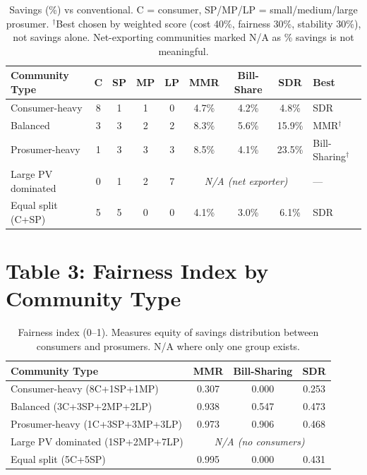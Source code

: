 \documentclass[12pt]{article}
\begin{document}
\begin{table}[h!]
\centering
\renewcommand{\arraystretch}{1.35}
\begin{tabular}{l c c c c c c c l}
\toprule
\textbf{Community Type} & \textbf{C} & \textbf{SP} & \textbf{MP} & \textbf{LP} & \textbf{MMR} & \textbf{Bill-Share} & \textbf{SDR} & \textbf{Best} \\
\midrule
Consumer-heavy & 8 & 1 & 1 & 0 & 4.7\% & 4.2\% & 4.8\% & SDR \\
Balanced & 3 & 3 & 2 & 2 & 8.3\% & 5.6\% & 15.9\% & MMR$^\dagger$ \\
Prosumer-heavy & 1 & 3 & 3 & 3 & 8.5\% & 4.1\% & 23.5\% & Bill-Sharing$^\dagger$ \\
Large PV dominated & 0 & 1 & 2 & 7 & \multicolumn{3}{c}{\textit{N/A (net exporter)}} & --- \\
Equal split (C+SP) & 5 & 5 & 0 & 0 & 4.1\% & 3.0\% & 6.1\% & SDR \\
\bottomrule
\end{tabular}
\caption*{Savings (\%) vs conventional. C = consumer, SP/MP/LP = small/medium/large prosumer. $^\dagger$Best chosen by weighted score (cost 40\%, fairness 30\%, stability 30\%), not savings alone. Net-exporting communities marked N/A as \% savings is not meaningful.}
\end{table}

\section*{Table 3: Fairness Index by Community Type}

\begin{table}[h!]
\centering
\renewcommand{\arraystretch}{1.35}
\begin{tabular}{l c c c}
\toprule
\textbf{Community Type} & \textbf{MMR} & \textbf{Bill-Sharing} & \textbf{SDR} \\
\midrule
Consumer-heavy (8C+1SP+1MP) & 0.307 & 0.000 & 0.253 \\
Balanced (3C+3SP+2MP+2LP) & 0.938 & 0.547 & 0.473 \\
Prosumer-heavy (1C+3SP+3MP+3LP) & 0.973 & 0.906 & 0.468 \\
Large PV dominated (1SP+2MP+7LP) & \multicolumn{3}{c}{\textit{N/A (no consumers)}} \\
Equal split (5C+5SP) & 0.995 & 0.000 & 0.431 \\
\bottomrule
\end{tabular}
\caption*{Fairness index (0--1). Measures equity of savings distribution between consumers and prosumers. N/A where only one group exists.}
\end{table}
\end{document}
